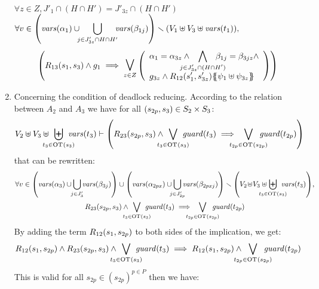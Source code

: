 \documentclass[runningheads]{llncs}
\begin{document}
\begin{enumerate}
$\forall z \in Z,  J'_1 \cap (H \cap H') = J'_{3z} \cap (H\cap H')$\\
$\displaystyle {\forall v \in {\left(\mathit{vars}{\left(\alpha_{1}\right)}  \cup\!\!\! \bigcup_{j \in J'_{3z} \cap H \cap H'} \!\!\!\mathit{vars}{\left(\beta_{1j} \right)} \right)} \smallsetminus{\left(V_1 \uplus  V_3 \uplus \mathit{vars}{\left(t_1\right)}\right)}},$
\begin{align*}
\mpar{R_{13}\mpar{s_1, s_3} \wedge g_1 \implies 
\operatorname*{\bigsymb{\bigvee}}_{z \in Z}
\mpar{\everymath{\displaystyle}
\begin{array}{l}
\alpha_1=\alpha_{3z}\wedge \bigwedge_\subbox{j \in J'_{3z} \cap (H\cap H')} \beta_{1j}=\beta_{3jz} \wedge \\g_{3z}\wedge 
{R_{12}\mpar{s'_1,s'_{3z}}}\psubst{\psi_1  \uplus \psi_{3z}}
\end{array}}}
\end{align*}	
\medskip
\item Concerning the condition of deadlock reducing. According to the relation between   $A_2$ and $A_3$ we have for all ${\left(s_{2p}, s_3\right)} \in S_2 \times S_3$:
\begin{multline*}
 V_2 \uplus V_3 \uplus \biguplus_\subbox{t_3 \in \fOT{s_3}} \fvars{t_3} \vdash \left(R_{23}\mpar{s_{2p}, s_3} \wedge \bigvee_\subbox{t_3 \in \fOT{s_3}} \fguard{t_3} \implies \bigvee_\subbox{t_{2p} \in \fOT{s_{2p}}} \fguard{t_{2p}} \right)
\end{multline*}
that can be rewritten:
\begin{multline*}
\everymath{\displaystyle}
\forall v\in \mpar{\fvars{\alpha_{3}}  \cup \!\!\bigcup_{j \in J'_{3}} \!\!\fvars{\beta_{3j}}} \cup \mpar{\fvars{\alpha_{2px}}  \cup \!\!\! \bigcup_{j \in J'_{2p}} \!\!\!\fvars{\beta_{2pxj}}}
 \setminus \mpar{V_2\! \uplus\!V_3 \uplus\!\! \biguplus_\subbox{t_3 \in \fOT{s_3}} \fvars{t_3}},\\
R_{23}\mpar{s_{2p}, s_3} \wedge \bigvee_\subbox{t_3 \in \fOT{s_3}} \fguard{t_3} \implies \bigvee_\subbox{t_{2p} \in \fOT{s_{2p}}} \fguard{t_{2p}} 
\end{multline*}
By adding the term $R_{12}{\left(s_1,s_{2p}\right)}$ to both sides of the implication, we get:
\begin{align*}
R_{12}\mpar{s_1,s_{2p}}\wedge R_{23}\mpar{s_{2p}, s_3} \wedge \bigvee_\subbox{t_3 \in \fOT{s_3}} \fguard{t_3} \implies R_{12}\mpar{s_1,s_{2p}}\wedge \bigvee_\subbox{t_{2p} \in \fOT{s_{2p}}} \fguard{t_{2p}} 
\end{align*}
This is valid for all $s_{2p} \in (s_{2p})^{p\in P}$ then we have:

\end{enumerate}
\end{document}
